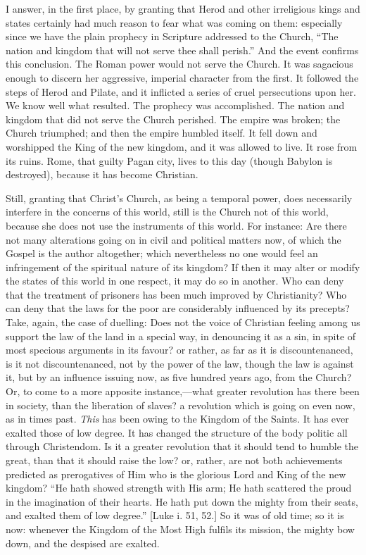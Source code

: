 I answer, in the first place, by granting that Herod and other
irreligious kings and states certainly had much reason to fear what
was coming on them: especially since we have the plain prophecy in
Scripture addressed to the Church, ``The nation and kingdom that
will not serve thee shall perish.'' And the event confirms this
conclusion. The Roman power would not serve the Church. It was
sagacious enough to discern her aggressive, imperial character from
the first. It followed the steps of Herod and Pilate, and it inflicted
a series of cruel persecutions upon her. We know well what resulted.
The prophecy was accomplished. The nation and kingdom that did not
serve the Church perished. The empire was broken; the Church
triumphed; and then the empire humbled itself. It fell down and
worshipped the King of the new kingdom, and it was allowed to live. It
rose from its ruins. Rome, that guilty Pagan city, lives to this day
(though Babylon is destroyed), because it has become Christian.

Still, granting that Christ's Church, as being a temporal power,
does necessarily interfere in the concerns of this world, still is the
Church not of this world, because she does not use the instruments of
this world. For instance: Are there not many alterations going on in
civil and political matters now, of which the Gospel is the author
altogether; which nevertheless no one would feel an infringement of
the spiritual nature of its kingdom? If then it may alter or modify
the states of this world in one respect, it may do so in another. Who
can deny that the treatment of prisoners has been much improved by
Christianity? Who can deny that the laws for the poor are considerably
influenced by its precepts? Take, again, the case of duelling: Does
not the voice of Christian feeling among us support the law of the
land in a special way, in denouncing it as a sin, in spite of most
specious arguments in its favour? or rather, as far as it is
discountenanced, is it not discountenanced, not by the power of the
law, though the law is against it, but by an influence issuing now, as
five hundred years ago, from the Church? Or, to come to a more
apposite instance,—what greater revolution has there been in
society, than the liberation of slaves? a revolution which is going on
even now, as in times past. \emph{This} has been owing to the Kingdom
of the Saints. It has ever exalted those of low degree. It has changed
the structure of the body politic all through Christendom. Is it a
greater revolution that it should tend to humble the great, than that
it should raise the low? or, rather, are not both achievements
predicted as prerogatives of Him who is the glorious Lord and King of
the new kingdom? ``He hath showed strength with His arm; He hath
scattered the proud in the imagination of their hearts. He hath put
down the mighty from their seats, and exalted them of low
degree.'' [Luke i. 51, 52.] So it was of old time; so it is now:
whenever the Kingdom of the Most High fulfils its mission, the mighty
bow down, and the despised are exalted.

